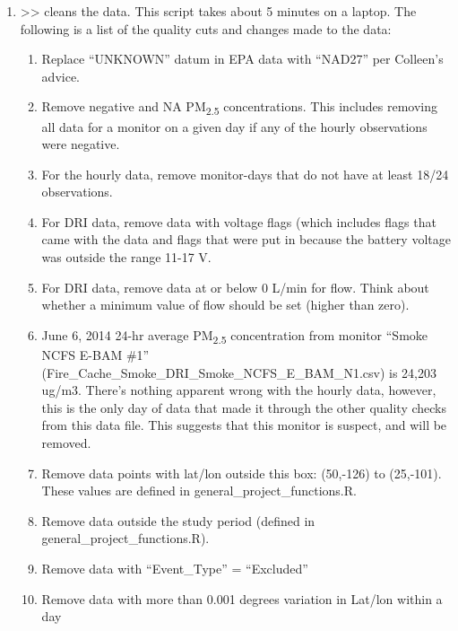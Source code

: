 \begin{enumerate}[nolistsep]
\item {} >> cleans the data. This script takes about 5 minutes on a laptop. The following is a list of the quality cuts and changes made to the data:
	\begin{enumerate}[nolistsep]
	\item Replace ``UNKNOWN'' datum in EPA data with ``NAD27'' per Colleen's advice.
	\item Remove negative and NA PM\textsubscript{2.5} concentrations. This includes removing all data for a monitor on a given day if any of the hourly observations were negative.
	\item For the hourly data, remove monitor-days that do not have at least 18/24 observations.
	\item For DRI data, remove data with voltage flags (which includes flags that came with the data and flags that were put in because the battery voltage was outside the range 11-17 V.
	\item For DRI data, remove data at or below 0 L/min for flow. Think about whether a minimum value of flow should be set (higher than zero).
	\item June 6, 2014 24-hr average PM\textsubscript{2.5} concentration from monitor ``Smoke NCFS E-BAM \#1'' (Fire\_Cache\_Smoke\_DRI\_Smoke\_NCFS\_E\_BAM\_N1.csv) is 24,203 ug/m3. There's nothing apparent wrong with the hourly data, however, this is the only day of data that made it through the other quality checks from this data file. This suggests that this monitor is suspect, and will be removed.
	\item Remove data points with lat/lon outside this box: (50,-126) to (25,-101). These values are defined in general\_project\_functions.R. %
	\item Remove data outside the study period (defined in general\_project\_functions.R).
	\item Remove data with ``Event\_Type'' = ``Excluded''
	\item Remove data with more than 0.001 degrees variation in Lat/lon within a day


\end{enumerate}
\end{enumerate}
